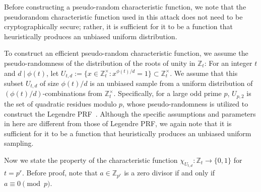 \documentclass[runningheads]{llncs}
\newcommand{\bb}[1]{\mathbb{#1}}  %
\begin{document}
       
        Before constructing a pseudo-random characteristic function, we note that the pseudorandom characteristic function used in this attack does not need to be cryptographically secure; rather, it is sufficient for it to be a function that heuristically produces an unbiased uniform distribution.
        
        To construct an efficient pseudo-random characteristic function, we assume the pseudo-randomness of the distribution of the roots of unity in $\bb Z_t$:
        For an integer $t$ and $d \mid \phi(t)$, let $U_{t,d}:=\{x\in \bb Z_t^\times:x^{\phi(t)/d}=1\} \subset \bb Z_t^\times$. We assume that this subset $U_{t,d}$ of size $\phi(t)/d$ is an unbiased sample from a uniform distribution of $(\phi(t)/d)$-combinations from $\bb Z_t^\times$. Specifically, for a large odd prime $p$, $U_{p,2}$ is the set of quadratic residues modulo $p$, whose pseudo-randomness is utilized to construct the Legendre PRF~\cite{LPRF}. Although the specific assumptions and parameters in here are different from those of Legendre PRF, we again note that it is sufficient for it to be a function that heuristically produces an unbiased uniform sampling.
        
        Now we state the property of the characteristic function $\chi_{U_{t,d}}: \bb Z_t\to\{0,1\}$ for $t=p^r$.
        Before proof, note that $a\in \bb Z_{p^r}$ is a zero divisor if and only if $a \equiv 0\pmod p$. 
        
\end{document}
